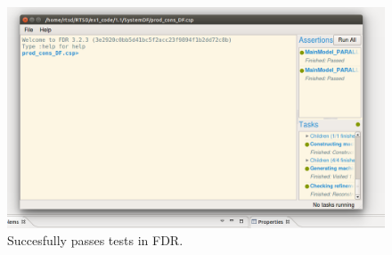 \documentclass[a4paper,twoside,11pt]{article}
\begin{document}
\begin{figure}
 \centering
 \includegraphics[width=\textwidth]{./images/1_1-SystemDF.png}
 \caption{Succesfully passes tests in FDR.}
 \label{fig:FDR_DF}
\end{figure}
\end{document}
